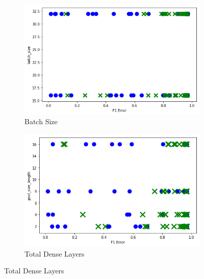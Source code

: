 \begin{figure}[H]
     \begin{subfigure}[b]{0.49\textwidth}
         \centering
         \includegraphics[width=\textwidth]{images/cnn_batch_size_dummy.png}
         \caption{Batch Size}
         \label{fig:cnn_batch_size_learning}
     \end{subfigure}
     \hfill
     \begin{subfigure}[b]{0.49\textwidth}
         \centering
         \includegraphics[width=\textwidth]{images/cnn_pooling_size_dummy.png}
         \caption{Total Dense Layers}
         \label{fig:cnn_dense_layers_learning}
     \end{subfigure}


\end{figure}

